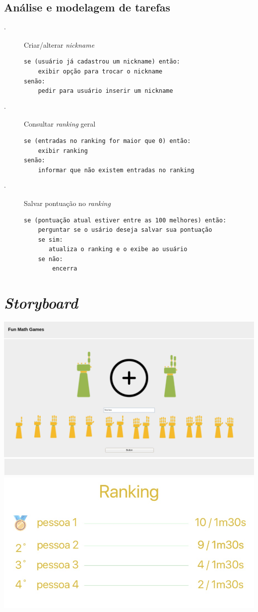 \documentclass[
    12pt,               %
    openany,          	%
    twoside,            %
    a4paper,            %
    brazil              %
    ]{abntex2}
\begin{document}
\section{Análise e modelagem de tarefas}
\begin{description}
\item[$\cdot$] Criar/alterar \textit{nickname}
\begin{verbatim}
se (usuário já cadastrou um nickname) então:
    exibir opção para trocar o nickname
senão:
    pedir para usuário inserir um nickname
\end{verbatim}

\item[$\cdot$] Consultar \textit{ranking} geral
\begin{verbatim}
se (entradas no ranking for maior que 0) então:
    exibir ranking
senão:
    informar que não existem entradas no ranking
\end{verbatim}

\item[$\cdot$] Salvar pontuação no \textit{ranking}
\begin{verbatim}
se (pontuação atual estiver entre as 100 melhores) então:
    perguntar se o usário deseja salvar sua pontuação
    se sim:
       atualiza o ranking e o exibe ao usuário
    se não:
        encerra
\end{verbatim}

\end{description}

\chapter{\textit{Storyboard}}

\includegraphics[scale=0.3]{storyboard}
\vfill
\includegraphics[scale=0.45]{rank}
\end{document}
